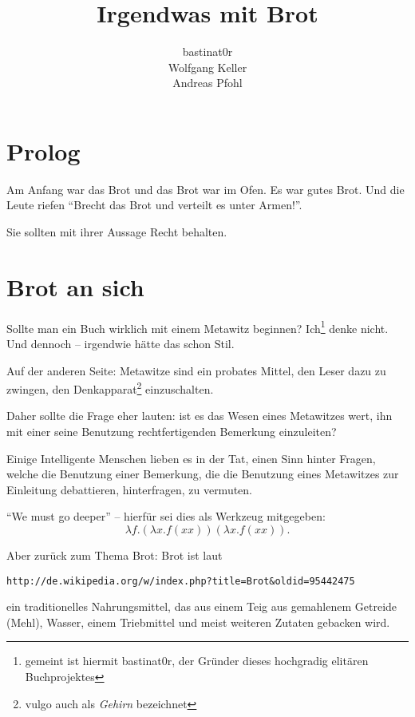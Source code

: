\documentclass{scrbook}
\title{Irgendwas mit Brot}
\author{bastinat0r \\ Wolfgang Keller \\ Andreas Pfohl}
\begin{document}
\maketitle

\chapter*{Prolog}
Am Anfang war das Brot und das Brot war im Ofen. Es war gutes Brot. Und die Leute riefen "`Brecht das Brot und verteilt es unter Armen!"'.

Sie sollten mit ihrer Aussage Recht behalten.

\chapter{Brot an sich}

Sollte man ein Buch wirklich mit einem Metawitz beginnen? Ich\footnote{gemeint ist hiermit bastinat0r, der Gründer dieses hochgradig elitären Buchprojektes} denke nicht. Und dennoch – irgendwie hätte das schon Stil.

Auf der anderen Seite: Metawitze sind ein probates Mittel, den Leser dazu zu zwingen, den Denkapparat\footnote{vulgo auch als \emph{Gehirn} bezeichnet} einzuschalten.

Daher sollte die Frage eher lauten: ist es das Wesen eines Metawitzes wert, ihn mit einer seine Benutzung rechtfertigenden Bemerkung einzuleiten?

Einige Intelligente Menschen lieben es in der Tat, einen Sinn hinter Fragen, welche die Benutzung einer Bemerkung, die die Benutzung eines Metawitzes zur Einleitung debattieren, hinterfragen, zu vermuten.

"`We must go deeper"' -- hierfür sei dies als Werkzeug mitgegeben:
\begin{displaymath}
\lambda f.(\lambda x.f (x x)) (\lambda x.f (x x)).
\end{displaymath}
%

Aber zurück zum Thema Brot: Brot ist laut \begin{verbatim}http://de.wikipedia.org/w/index.php?title=Brot&oldid=95442475\end{verbatim} ein traditionelles Nahrungsmittel, das aus einem Teig aus gemahlenem Getreide (Mehl), Wasser, einem Triebmittel und meist weiteren Zutaten gebacken wird.
\end{document}
